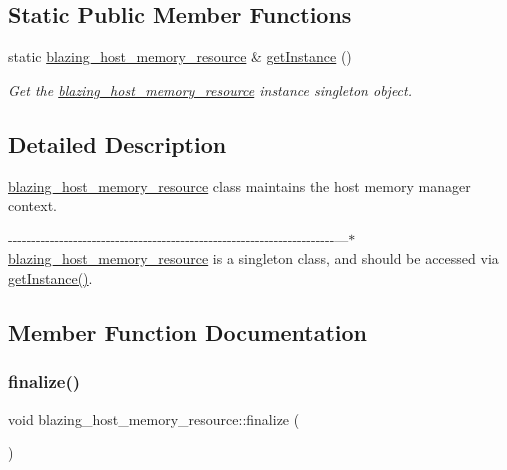 \subsection*{Static Public Member Functions}
\begin{DoxyCompactItemize}
\item 
static \hyperlink{classblazing__host__memory__resource}{blazing\+\_\+host\+\_\+memory\+\_\+resource} \& \hyperlink{classblazing__host__memory__resource_a1fa50b80350c0718dc4ee026e8425e7a}{get\+Instance} ()
\begin{DoxyCompactList}\small\item\em Get the \hyperlink{classblazing__host__memory__resource}{blazing\+\_\+host\+\_\+memory\+\_\+resource} instance singleton object. \end{DoxyCompactList}\end{DoxyCompactItemize}


\subsection{Detailed Description}
\hyperlink{classblazing__host__memory__resource}{blazing\+\_\+host\+\_\+memory\+\_\+resource} class maintains the host memory manager context. 

-\/-\/-\/-\/-\/-\/-\/-\/-\/-\/-\/-\/-\/-\/-\/-\/-\/-\/-\/-\/-\/-\/-\/-\/-\/-\/-\/-\/-\/-\/-\/-\/-\/-\/-\/-\/-\/-\/-\/-\/-\/-\/-\/-\/-\/-\/-\/-\/-\/-\/-\/-\/-\/-\/-\/-\/-\/-\/-\/-\/-\/-\/-\/-\/-\/-\/-\/-\/-\/-\/---$\ast$ \hyperlink{classblazing__host__memory__resource}{blazing\+\_\+host\+\_\+memory\+\_\+resource} is a singleton class, and should be accessed via \hyperlink{classblazing__host__memory__resource_a1fa50b80350c0718dc4ee026e8425e7a}{get\+Instance()}. 

\subsection{Member Function Documentation}
\mbox{\label{classblazing__host__memory__resource_a05d933cea38920323a6d9d006019fac3}} 
\subsubsection{\texorpdfstring{finalize()}{finalize()}}
{\footnotesize\ttfamily void blazing\+\_\+host\+\_\+memory\+\_\+resource\+::finalize (\begin{DoxyParamCaption}{ }\end{DoxyParamCaption})}





